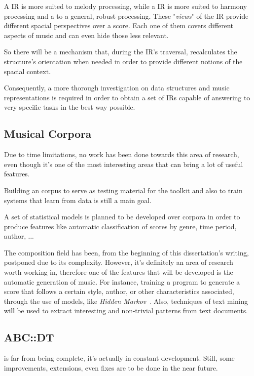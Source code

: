 A \partwise{} \ac{IR} is more suited to melody processing, while a \timewise{} \ac{IR} is more
suited to harmony processing and a \sourcewise{} to a general, robust processing. These
"\emph{views}" of the \ac{IR} provide different spacial perspectives over a score. Each one of them
covers different aspects of music and can even hide those less relevant.

So there will be a mechanism that, during the \ac{IR}'s traversal, recalculates the structure's
orientation when needed in order to provide different notions of the spacial context.

Consequently, a more thorough investigation on data structures and music representations is required
in order to obtain a set of \ac{IR}s capable of answering to very specific tasks in the best way
possible.

\subsection*{Musical Corpora}

Due to time limitations, no work has been done towards this area of research, even though it's one
of the most interesting areas that can bring a lot of useful features.

Building an \abc{} corpus to serve as testing material for the toolkit and also to train systems
that learn from data is still a main goal.

A set of statistical models is planned to be developed over \abc{} corpora in order to produce
features like automatic classification of scores by genre, time period, author, ...

The composition field has been, from the beginning of this dissertation's writing, postponed due to
its complexity. However, it's definitely an area of research worth working in, therefore one of the
features that will be developed is the automatic generation of music. For instance, training a
program to generate a score that follows a certain style, author, or other characteristics
associated, through the use of models, like \emph{Hidden Markov}~\cite{chai2001folk,Lo2010}. Also,
techniques of text mining~\cite{Tan1999} will be used to extract interesting and non-trivial
patterns from text documents.

\subsection*{ABC::DT}

\abcdt{} is far from being complete, it's actually in constant development. Still, some
improvements, extensions, even fixes are to be done in the near future.

